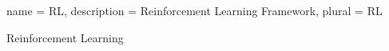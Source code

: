 
{
  name = RL,
  description = {Reinforcement Learning Framework},
  plural = RL
}


{Reinforcement Learning}